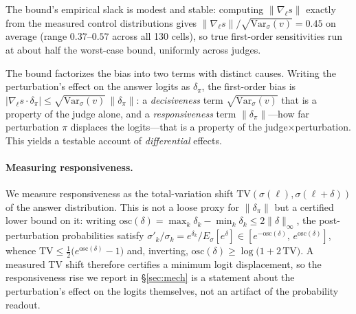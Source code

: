 \documentclass[11pt]{article}
\begin{document}
\smallskip
\noindent The bound's empirical slack is modest and stable: computing
$\|\nabla_\ell s\|$ exactly from the measured control distributions gives
$\|\nabla_\ell s\|/\sqrt{\mathrm{Var}_\sigma(v)} = 0.45$ on average (range
$0.37$--$0.57$ across all 130 cells), so true first-order sensitivities run at about
half the worst-case bound, uniformly across judges.

\medskip
The bound factorizes the bias into two terms with distinct causes. Writing the
perturbation's effect on the answer logits as $\delta_\pi$, the first-order bias is
$|\nabla_\ell s\cdot\delta_\pi|\le\sqrt{\mathrm{Var}_\sigma(v)}\,\|\delta_\pi\|$: a
\emph{decisiveness} term $\sqrt{\mathrm{Var}_\sigma(v)}$ that is a property of the judge
alone, and a \emph{responsiveness} term $\|\delta_\pi\|$---how far perturbation $\pi$
displaces the logits---that is a property of the judge$\times$perturbation. This yields
a testable account of \emph{differential} effects.

\paragraph{Measuring responsiveness.} We measure responsiveness as the total-variation
shift $\mathrm{TV}(\sigma(\ell),\sigma(\ell+\delta))$ of the answer distribution. This
is not a loose proxy for $\|\delta_\pi\|$ but a certified lower bound on it: writing
$\mathrm{osc}(\delta)=\max_k\delta_k-\min_k\delta_k \le 2\|\delta\|_\infty$, the
post-perturbation probabilities satisfy $\sigma'_k/\sigma_k = e^{\delta_k}/E_\sigma[e^{\delta}]
\in [e^{-\mathrm{osc}(\delta)},\, e^{\mathrm{osc}(\delta)}]$, whence
$\mathrm{TV} \le \tfrac{1}{2}\big(e^{\mathrm{osc}(\delta)}-1\big)$ and, inverting,
$\mathrm{osc}(\delta) \ge \log\!\big(1+2\,\mathrm{TV}\big)$. A measured TV shift
therefore certifies a minimum logit displacement, so the responsiveness rise we report
in \S\ref{sec:mech} is a statement about the perturbation's effect on the logits
themselves, not an artifact of the probability readout.
\end{document}
